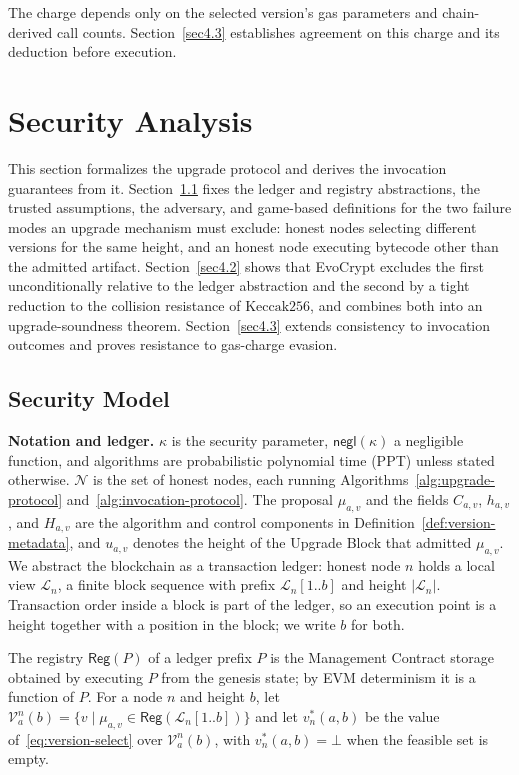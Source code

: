 \documentclass[runningheads]{llncs}
\begin{document}
The charge depends only on the selected version's gas parameters and chain-derived call counts. Section~\ref{sec4.3} establishes agreement on this charge and its deduction before execution.

\section{Security Analysis}\label{sec4}

This section formalizes the upgrade protocol and derives the invocation guarantees from it. Section~\ref{sec4.1} fixes the ledger and registry abstractions, the trusted assumptions, the adversary, and game-based definitions for the two failure modes an upgrade mechanism must exclude: honest nodes selecting different versions for the same height, and an honest node executing bytecode other than the admitted artifact. Section~\ref{sec4.2} shows that EvoCrypt excludes the first unconditionally relative to the ledger abstraction and the second by a tight reduction to the collision resistance of $\mathrm{Keccak256}$, and combines both into an upgrade-soundness theorem. Section~\ref{sec4.3} extends consistency to invocation outcomes and proves resistance to gas-charge evasion.

\subsection{Security Model}\label{sec4.1}

\noindent\textbf{Notation and ledger.} $\kappa$ is the security parameter, $\mathsf{negl}(\kappa)$ a negligible function, and algorithms are probabilistic polynomial time (PPT) unless stated otherwise. $\mathcal{N}$ is the set of honest nodes, each running Algorithms~\ref{alg:upgrade-protocol} and~\ref{alg:invocation-protocol}. The proposal $\mu_{a,v}$ and the fields $C_{a,v}$, $h_{a,v}$, and $H_{a,v}$ are the algorithm and control components in Definition~\ref{def:version-metadata}, and $u_{a,v}$ denotes the height of the Upgrade Block that admitted $\mu_{a,v}$. We abstract the blockchain as a transaction ledger: honest node $n$ holds a local view $\mathcal{L}_n$, a finite block sequence with prefix $\mathcal{L}_n[1..b]$ and height $|\mathcal{L}_n|$. Transaction order inside a block is part of the ledger, so an execution point is a height together with a position in the block; we write $b$ for both.

\begin{definition}
\label{def:registry}
The registry $\mathsf{Reg}(P)$ of a ledger prefix $P$ is the Management Contract storage obtained by executing $P$ from the genesis state; by EVM determinism it is a function of $P$. For a node $n$ and height $b$, let $\mathcal{V}^{n}_{a}(b)=\{v \mid \mu_{a,v}\in\mathsf{Reg}(\mathcal{L}_n[1..b])\}$ and let $v^{*}_{n}(a,b)$ be the value of~\eqref{eq:version-select} over $\mathcal{V}^{n}_{a}(b)$, with $v^{*}_{n}(a,b)=\bot$ when the feasible set is empty.
\end{definition}
\end{document}
